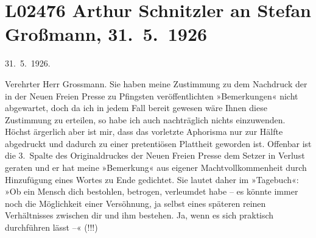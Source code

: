 

\section[Arthur Schnitzler an Stefan Großmann, 31. 5. 1926]{L02476 Arthur Schnitzler an Stefan Großmann, 31. 5. 1926}
\nopagebreak{}
\rehead{ }\normalsize\beginnumbering{}
\toendnotes[C]{\smallbreak\pagebreak[2]}
\toendnotes[C]{\smallbreak}
\pstart
           \raggedleft{}{\pb}31. 5. 1926. \pend
           
\pstart{}Verehrter Herr Grossmann.\pend\vspace{0.5em}
\pstart
           Sie haben meine Zustimmung zu dem Nachdruck der in der Neuen Freien
                  Presse zu Pfingsten veröffentlichten »Bemerkungen« nicht abgewartet, doch da ich in jedem Fall
               bereit gewesen wäre Ihnen diese Zustimmung zu erteilen, so habe ich auch nachträglich
               nichts einzuwenden. Höchst ärgerlich aber ist mir, dass das vorletzte Aphorisma nur
               zur Hälfte abgedruckt und dadurch zu einer pretentiösen Plattheit geworden ist.
               Offenbar ist die 3. Spalte des Originaldruckes der Neuen Freien Presse
               dem Setzer in Verlust geraten und er hat meine »Bemerkung« aus eigener
               Machtvollkommenheit durch Hinzufügung eines Wortes zu Ende gedichtet. Sie lautet
               daher im »Tagebuch«: »Ob ein Mensch dich
               bestohlen, betrogen, verleumdet habe – es könnte immer noch die Möglichkeit einer
               Versöhnung, ja selbst eines späteren reinen Verhältnisses zwischen dir und ihm
               bestehen. Ja, wenn es sich praktisch durchführen lässt –« (!!!)\pend
           
